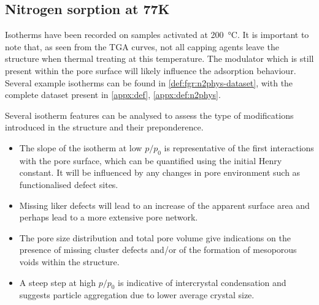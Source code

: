 
\subsection{Nitrogen sorption at 77K}

Isotherms have been recorded on samples activated at
\SI{200}{\degreeCelsius}.
It is important to note that, as seen from the TGA curves,
not all capping agents leave the structure when thermal treating
at this temperature. The modulator which is still present
within the pore surface will likely influence the adsorption
behaviour. Several example isotherms can be found in
\autoref{def:fgr:n2phys-dataset}, with the complete dataset
present in \autoref{appx:def}, \autoref{appx:def:n2phys}.

Several isotherm features can be analysed to assess the
type of modifications introduced in the structure and their
preponderence.

\begin{itemize}
	\item The slope of the isotherm at low \(p/p_0\) is representative
	      of the first interactions with the pore surface, which can be
	      quantified using the initial Henry constant. It will be influenced
	      by any changes in pore environment such as functionalised defect
	      sites.
	\item Missing liker defects will lead to an increase of the
	      apparent surface area and perhaps lead to a more extensive
	      pore network.
	\item The pore size distribution and total pore volume give
	      indications on the presence of missing cluster defects and/or
	      of the formation of mesoporous voids within the structure.
	\item A steep step at high \(p/p_0\) is indicative of intercrystal
	      condensation and suggests particle aggregation due to lower average
	      crystal size.
\end{itemize}

